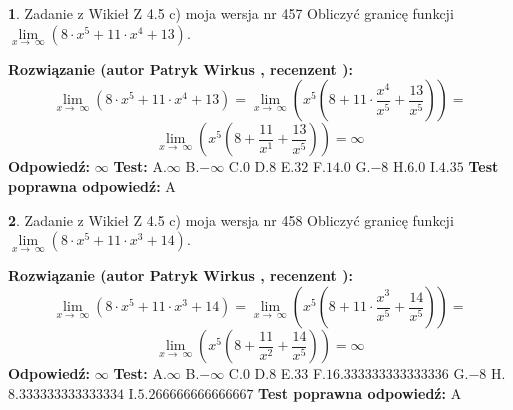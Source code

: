 \documentclass[12pt, a4paper]{article}
\theoremstyle{definition} %
\newtheorem{zad}{}
\newcommand{\zadStart}[1]{\begin{zad}#1\newline}
\newcommand{\zadStop}{\end{zad}}
\newcommand{\rozwStart}[2]{\noindent \textbf{Rozwiązanie (autor #1 , recenzent #2): }\newline}
\newcommand{\rozwStop}{\newline}
\newcommand{\odpStart}{\noindent \textbf{Odpowiedź:}\newline}
\newcommand{\odpStop}{\newline}
\newcommand{\testStart}{\noindent \textbf{Test:}\newline}
\newcommand{\testStop}{\newline}
\newcommand{\kluczStart}{\noindent \textbf{Test poprawna odpowiedź:}\newline}
\newcommand{\kluczStop}{\newline}
\begin{document}
\zadStart{Zadanie z Wikieł Z 4.5 c) moja wersja nr 457}
Obliczyć granicę funkcji  $\lim\limits_{x\to\ \infty}(8 \cdot x^{5}+11 \cdot x^{4}+13)$.
\zadStop
\rozwStart{Patryk Wirkus}{}
$$\lim\limits_{x\to\ \infty}(8 \cdot x^{5}+11 \cdot x^{4}+13) = \lim\limits_{x\to\ \infty}(x^{5}(8 +11 \cdot \frac{x^{4}}{x^{5}}+\frac{13}{x^{5}})) =$$ $$\lim\limits_{x\to\ \infty}(x^{5}(8 +\frac{11}{x^{1}}+\frac{13}{x^{5}})) =\infty$$
\rozwStop
\odpStart
$\infty$
\odpStop
\testStart
A.$\infty$ B.$-\infty$ C.$0$ D.$8$ E.$32$
F.$14.0$ G.$-8$
H.$6.0$
I.$4.35$
\testStop
\kluczStart
A
\kluczStop



\zadStart{Zadanie z Wikieł Z 4.5 c) moja wersja nr 458}
Obliczyć granicę funkcji  $\lim\limits_{x\to\ \infty}(8 \cdot x^{5}+11 \cdot x^{3}+14)$.
\zadStop
\rozwStart{Patryk Wirkus}{}
$$\lim\limits_{x\to\ \infty}(8 \cdot x^{5}+11 \cdot x^{3}+14) = \lim\limits_{x\to\ \infty}(x^{5}(8 +11 \cdot \frac{x^{3}}{x^{5}}+\frac{14}{x^{5}})) =$$ $$\lim\limits_{x\to\ \infty}(x^{5}(8 +\frac{11}{x^{2}}+\frac{14}{x^{5}})) =\infty$$
\rozwStop
\odpStart
$\infty$
\odpStop
\testStart
A.$\infty$ B.$-\infty$ C.$0$ D.$8$ E.$33$
F.$16.333333333333336$ G.$-8$
H.$8.333333333333334$
I.$5.266666666666667$
\testStop
\kluczStart
A
\kluczStop
\end{document}
